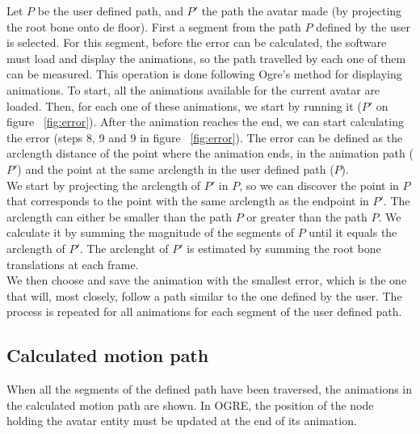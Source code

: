 \documentclass[a4paper]{article}
\begin{document}
Let $P$ be the user defined path, and $P'$ the path the avatar made (by projecting the root bone onto de floor). First a segment from the path $P$ defined by the user is selected. For this segment, before the error can be calculated, the software must load and display the animations, so the path travelled by each one of them can be measured. This operation is done following Ogre\textquoteright s method for displaying animations. To start, all the animations available for the current avatar are loaded. Then, for each one of these animations, we start by running it ($P'$ on figure ~\ref{fig:error}). After the animation reaches the end, we can start calculating the error (steps 8, 9 and 9 in figure ~\ref{fig:error}). The error can be defined as the arclength distance of the point where the animation ends, in the animation path ($P'$) and the point at the same arclength in the user defined path ($P$).  \\

We start by projecting the arclength of $P'$ in $P$, so we can discover the point in $P$ that corresponds to the point with the same arclength as the endpoint in $P'$. The arclength can either be smaller than the path $P$ or greater than the path $P$.
We calculate it by summing the magnitude of the segments of $P$ until it equals the arclength of $P'$. The arclenght of $P'$ is estimated by summing the root bone translations at each frame. \\

We then choose and save the animation with the smallest error, which is the one that will, most closely, follow a path similar to the one defined by the user. The process is repeated for all animations for each segment of the user defined path. \\






\subsection{Calculated motion path}

When all the segments of the defined path have been traversed, the animations in the calculated motion path are shown. In OGRE, the position of the node holding the avatar entity must be updated at the end of its animation. 
\end{document}
